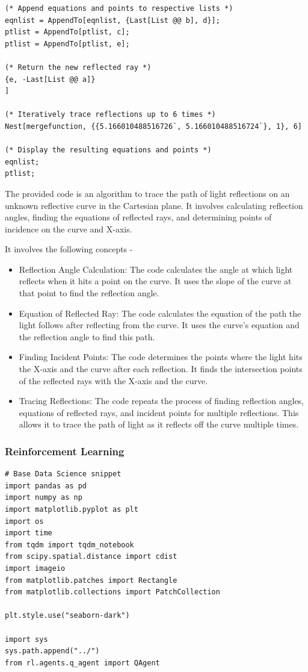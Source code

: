 \documentclass[12pt,a4paper,twoside]{report}
\begin{document}
\begin{lstlisting}[style=mathematica]
(* Append equations and points to respective lists *)
eqnlist = AppendTo[eqnlist, {Last[List @@ b], d}];
ptlist = AppendTo[ptlist, c];
ptlist = AppendTo[ptlist, e];

(* Return the new reflected ray *)
{e, -Last[List @@ a]}
]

(* Iteratively trace reflections up to 6 times *)
Nest[mergefunction, {{5.166010488516726`, 5.166010488516724`}, 1}, 6]

(* Display the resulting equations and points *)
eqnlist;
ptlist;

\end{lstlisting}

The provided code is an algorithm to trace the path of light reflections on an unknown reflective curve in the Cartesian plane. It involves calculating reflection angles, finding the equations of reflected rays, and determining points of incidence on the curve and X-axis.

It involves the following concepts - 
\begin{itemize}
\item Reflection Angle Calculation:
The code calculates the angle at which light reflects when it hits a point on the curve. It uses the slope of the curve at that point to find the reflection angle.

\item Equation of Reflected Ray:
The code calculates the equation of the path the light follows after reflecting from the curve. It uses the curve's equation and the reflection angle to find this path.

\item Finding Incident Points:
The code determines the points where the light hits the X-axis and the curve after each reflection. It finds the intersection points of the reflected rays with the X-axis and the curve.

\item Tracing Reflections:
The code repeats the process of finding reflection angles, equations of reflected rays, and incident points for multiple reflections. This allows it to trace the path of light as it reflects off the curve multiple times.
\end{itemize}

\subsubsection{Reinforcement Learning}
\begin{lstlisting}
# Base Data Science snippet
import pandas as pd
import numpy as np
import matplotlib.pyplot as plt
import os
import time
from tqdm import tqdm_notebook
from scipy.spatial.distance import cdist
import imageio
from matplotlib.patches import Rectangle
from matplotlib.collections import PatchCollection

plt.style.use("seaborn-dark")

import sys
sys.path.append("../")
from rl.agents.q_agent import QAgent


\end{lstlisting}
\end{document}

